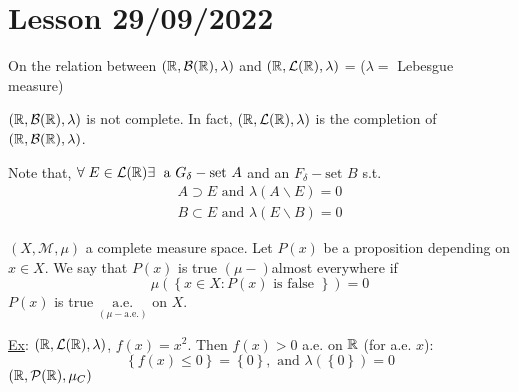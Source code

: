 \section{Lesson 29/09/2022}
\begin{remark}
    On the relation between \((\mathbb{R}, \mathcal{B}(\mathbb{R}), \lambda)\) and  \((\mathbb{R}, \mathcal{L}(\mathbb{R}), \lambda)\) = (\(\lambda =\) Lebesgue measure)

    \((\mathbb{R}, \mathcal{B}(\mathbb{R}), \lambda)\) is not complete. In fact, \((\mathbb{R}, \mathcal{L}(\mathbb{R}), \lambda)\) is the completion of \((\mathbb{R}, \mathcal{B}(\mathbb{R}), \lambda)\).

    Note that, \(\forall \; E \in \mathcal{L}(\mathbb{R}) \exists \; \mbox{ a } G_{\delta}-\mbox{set } A\) and an \(F_{\delta}-\mbox{set } B\) s.t.
    \[
        \begin{array}{l}
            A \supset E \mbox{ and } \lambda(A \backslash E) = 0 \\
            B \subset E \mbox{ and } \lambda(E \backslash B) = 0
        \end{array}
    \]
\end{remark}
\((X, \mathcal{M}, \mu)\) a complete measure space. Let \(P(x)\) be a proposition depending on \(x \in X\). We say that \(P(x)\) is true \((\mu-)\)almost everywhere if 
\[
    \mu\left(\left\{ x \in X : P(x) \mbox{ is false }\right\}\right) = 0
\]
\(P(x)\) is true \(\underset{(\mu-\mbox{a.e.})}{\mbox{a.e.}}\) on \(X\).

\underline{Ex}: \((\mathbb{R}, \mathcal{L}(\mathbb{R}), \lambda)\), \(f(x) = x^2\).  
Then \(f(x) > 0\) a.e. on \(\mathbb{R}\) (for a.e. \(x\)):
\[
    \left\{ f(x) \leq 0 \right\} = \left\{ 0 \right\}, \mbox{ and } \lambda(\left\{ 0 \right\}) = 0
\]
\((\mathbb{R}, \mathcal{P}(\mathbb{R}), \mu_C)\)